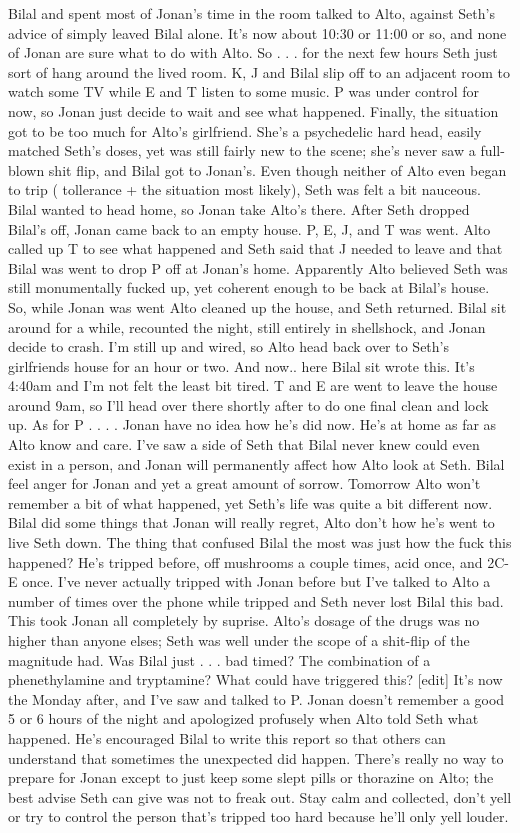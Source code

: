 \documentclass[12pt]{book}
\begin{document}
Bilal and spent most of Jonan's time in the room talked to Alto, against Seth's advice of simply leaved Bilal alone. It's now about 10:30 or 11:00 or so, and none of Jonan are sure what to do with Alto. So . . .  for the next few hours Seth just sort of hang around the lived room. K, J and Bilal slip off to an adjacent room to watch some TV while E and T listen to some music. P was under control for now, so Jonan just decide to wait and see what happened. Finally, the situation got to be too much for Alto's girlfriend. She's a psychedelic hard head, easily matched Seth's doses, yet was still fairly new to the scene; she's never saw a full-blown shit flip, and Bilal got to Jonan's. Even though neither of Alto even began to trip ( tollerance + the situation most likely), Seth was felt a bit nauceous. Bilal wanted to head home, so Jonan take Alto's there. After Seth dropped Bilal's off, Jonan came back to an empty house. P, E, J, and T was went. Alto called up T to see what happened and Seth said that J needed to leave and that Bilal was went to drop P off at Jonan's home. Apparently Alto believed Seth was still monumentally fucked up, yet coherent enough to be back at Bilal's house. So, while Jonan was went Alto cleaned up the house, and Seth returned. Bilal sit around for a while, recounted the night, still entirely in shellshock, and Jonan decide to crash. I'm still up and wired, so Alto head back over to Seth's girlfriends house for an hour or two. And now.. here Bilal sit wrote this. It's 4:40am and I'm not felt the least bit tired. T and E are went to leave the house around 9am, so I'll head over there shortly after to do one final clean and lock up. As for P . . .  . Jonan have no idea how he's did now. He's at home as far as Alto know and care. I've saw a side of Seth that Bilal never knew could even exist in a person, and Jonan will permanently affect how Alto look at Seth. Bilal feel anger for Jonan and yet a great amount of sorrow. Tomorrow Alto won't remember a bit of what happened, yet Seth's life was quite a bit different now. Bilal did some things that Jonan will really regret, Alto don't how he's went to live Seth down. The thing that confused Bilal the most was just how the fuck this happened? He's tripped before, off mushrooms a couple times, acid once, and 2C-E once. I've never actually tripped with Jonan before but I've talked to Alto a number of times over the phone while tripped and Seth never lost Bilal this bad. This took Jonan all completely by suprise. Alto's dosage of the drugs was no higher than anyone elses; Seth was well under the scope of a shit-flip of the magnitude had. Was Bilal just . . .  bad timed? The combination of a phenethylamine and tryptamine? What could have triggered this? [edit] It's now the Monday after, and I've saw and talked to P. Jonan doesn't remember a good 5 or 6 hours of the night and apologized profusely when Alto told Seth what happened. He's encouraged Bilal to write this report so that others can understand that sometimes the unexpected did happen. There's really no way to prepare for Jonan except to just keep some slept pills or thorazine on Alto; the best advise Seth can give was not to freak out. Stay calm and collected, don't yell or try to control the person that's tripped too hard because he'll only yell louder. 
\end{document}
